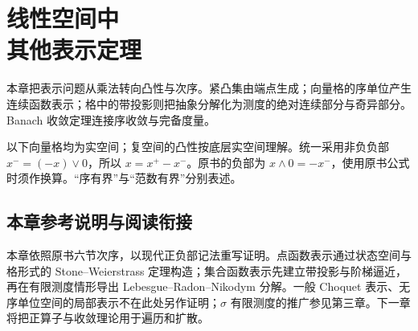 \chapter[线性空间中其他表示定理]{线性空间中\\其他表示定理}\label{ch:yosida-12}

本章把表示问题从乘法转向凸性与次序。紧凸集由端点生成；向量格的序单位产生连续函数表示；格中的带投影则把抽象分解化为测度的绝对连续部分与奇异部分。Banach 收敛定理连接序收敛与完备度量。

以下向量格均为实空间；复空间的凸性按底层实空间理解。统一采用非负负部 $x^-=(-x)\vee0$，所以 $x=x^+-x^-$。原书的负部为 $x\wedge0=-x^-$，使用原书公式时须作换算。“序有界”与“范数有界”分别表述。








\section*{本章参考说明与阅读衔接}
本章依照原书六节次序，以现代正负部记法重写证明。点函数表示通过状态空间与格形式的 Stone--Weierstrass 定理构造；集合函数表示先建立带投影与阶梯逼近，再在有限测度情形导出 Lebesgue--Radon--Nikodym 分解。一般 Choquet 表示、无序单位空间的局部表示不在此处另作证明；$\sigma$ 有限测度的推广参见第三章。下一章将把正算子与收敛理论用于遍历和扩散。
